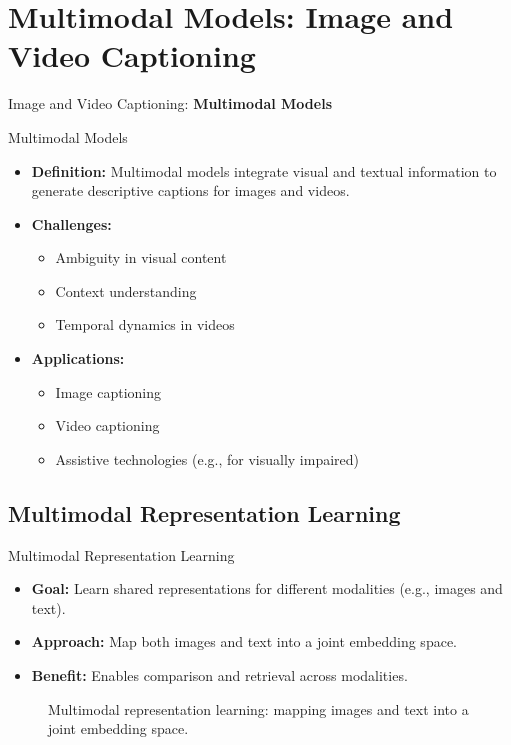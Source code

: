 \section{Multimodal Models: Image and Video Captioning}
\begin{frame}{}
    \LARGE Image and Video Captioning: \textbf{Multimodal Models}
\end{frame}

\begin{frame}[allowframebreaks]{Multimodal Models}
    \begin{itemize}
        \item \textbf{Definition:} Multimodal models integrate visual and textual information to generate descriptive captions for images and videos.
        \item \textbf{Challenges:}
        \begin{itemize}
            \item Ambiguity in visual content
            \item Context understanding
            \item Temporal dynamics in videos
        \end{itemize}
        \item \textbf{Applications:}
        \begin{itemize}
            \item Image captioning
            \item Video captioning
            \item Assistive technologies (e.g., for visually impaired)
        \end{itemize}
    \end{itemize}
\end{frame}

\subsection{Multimodal Representation Learning}
\begin{frame}[allowframebreaks]{Multimodal Representation Learning}
    \begin{itemize}
        \item \textbf{Goal:} Learn shared representations for different modalities (e.g., images and text).
        \item \textbf{Approach:} Map both images and text into a joint embedding space.
        \item \textbf{Benefit:} Enables comparison and retrieval across modalities.
    \end{itemize}
\framebreak
    \begin{figure}
        \centering
        \caption*{Multimodal representation learning: mapping images and text into a joint embedding space.}
    \end{figure}
\end{frame}

